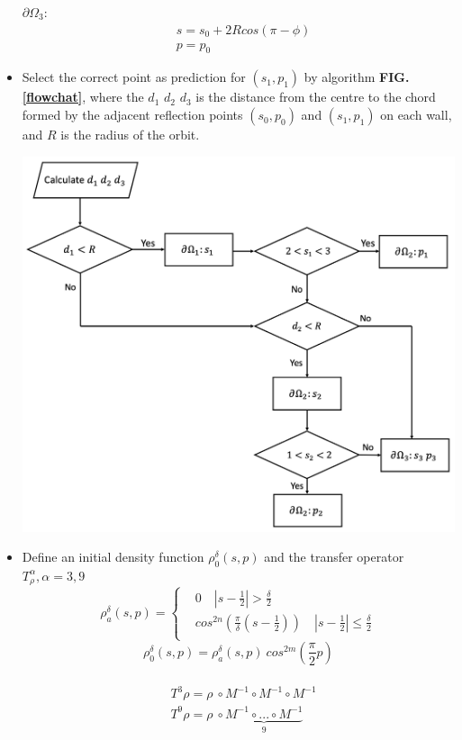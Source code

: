 \documentclass[a0,portrait]{a0poster}
\begin{document}
\begin{multicols}{3}
\begin{itemize}
$\partial \Omega_3$:
\begin{equation}
\begin{aligned}
& s=s_0+2Rcos(\pi-\phi)\\
& p=p_0
\end{aligned}
\end{equation}
    \item Select the correct point as prediction for $(s_1,p_1)$ by algorithm \textbf{FIG.\ref{flowchat}}, where the $d_1$ $d_2$ $d_3$ is the distance from the centre to the  chord formed by the adjacent reflection points $(s_0,p_0)$ and $(s_1,p_1)$ on each wall, and $R$ is the radius of the orbit.

\begin{center}\vspace{1cm}
    \includegraphics[width=0.5\linewidth]{flowchat.png}
    \label{flowchat}
\end{center}%
\item Define an initial density function $\rho^{\delta}_0(s,p)$ and the transfer operator $T^{\alpha}_{\rho}, \alpha=3,9$
\begin{equation}
\rho_a^{\delta}(s,p) =\left\{
	\begin{aligned}
	&0 \quad |s-\frac{1}{2}|>\frac{\delta}{2}\\
	&cos^{2n}(\frac{\pi}{\delta}(s-\frac{1}{2})) \quad |s-\frac{1}{2}|\leq\frac{\delta}{2}\\
	\end{aligned}
	\right
.
\end{equation}
\begin{equation}
\rho_0^{\delta} (s,p)= \rho_a^{\delta}(s,p) \ cos^{2m}(\frac{\pi}{2}p)
\end{equation}\\
\begin{equation}
\begin{aligned}
& T^3\rho=\rho \ \circ M^{-1} \circ M^{-1} \circ M^{-1}\\
& T^9\rho=\rho \ \circ \underbrace{M^{-1} \circ ... \circ M^{-1}}_{9}
\end{aligned}
\end{equation}
\end{itemize}


\end{multicols}
\end{document}

